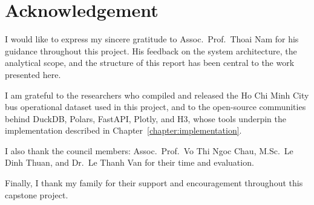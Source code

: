 \chapter*{Acknowledgement}

I would like to express my sincere gratitude to Assoc.\ Prof.\ Thoai Nam for his guidance throughout this project. His feedback on the system architecture, the analytical scope, and the structure of this report has been central to the work presented here.

\noindent I am grateful to the researchers who compiled and released the Ho Chi Minh City bus operational dataset used in this project, and to the open-source communities behind DuckDB, Polars, FastAPI, Plotly, and H3, whose tools underpin the implementation described in Chapter~\ref{chapter:implementation}.

\noindent I also thank the council members: Assoc.\ Prof.\ Vo Thi Ngoc Chau, M.Sc.\ Le Dinh Thuan, and Dr.\ Le Thanh Van for their time and evaluation.

\noindent Finally, I thank my family for their support and encouragement throughout this capstone project.

